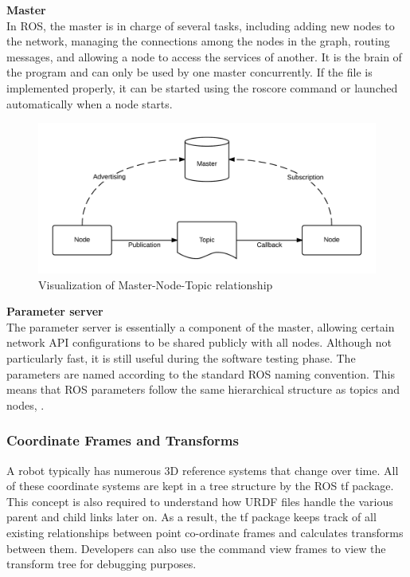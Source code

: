 \textbf{Master}\\
In ROS, the master is in charge of several tasks, including adding new nodes to the network, managing the connections among the nodes in the graph, routing messages, and allowing a node to access the services of another.
It is the brain of the program and can only be used by one master concurrently. If the file is implemented properly, it can be started using the roscore command or launched automatically when a node starts.
\begin{figure}[H]
    \centering
    \includegraphics{Images/Chapter 2/ROS-master-node-topic.png}
    \caption{Visualization of Master-Node-Topic relationship}
    \label{fig:master-node-topic}
\end{figure}

\textbf{Parameter server}\\
The parameter server is essentially a component of the master, allowing certain network API configurations to be shared publicly with all nodes. Although not particularly fast, it is still useful during the software testing phase. The parameters are named according to the standard ROS naming convention. This means that ROS parameters follow the same hierarchical structure as topics and nodes, \citet{rosparmserv}.

\subsubsection{Coordinate Frames and Transforms}
A robot typically has numerous 3D reference systems that change over time. All of these coordinate systems are kept in a tree structure by the ROS tf package. This concept is also required to understand how URDF files handle the various parent and child links later on. As a result, the tf package keeps track of all existing relationships between point co-ordinate frames and calculates transforms between them. Developers can also use the command view frames to view the transform tree for debugging purposes.

